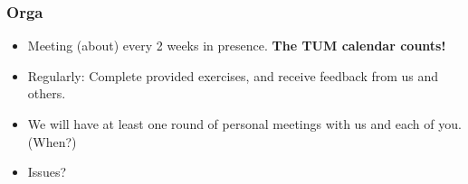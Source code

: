 \documentclass{i20lecture}
\begin{document}
% 
% 


\begin{frame}
  \frametitle{Orga}
  \begin{itemize}
	  \item Meeting (about) every \alert{2} weeks in presence. \textbf{The TUM calendar counts!}
	  \item Regularly: Complete provided exercises, and receive feedback from us and others.
	  \item We will have at least one round of personal meetings with us and each of you. (When?)
	  \item Issues?
  \end{itemize}
\end{frame}
\end{document}
